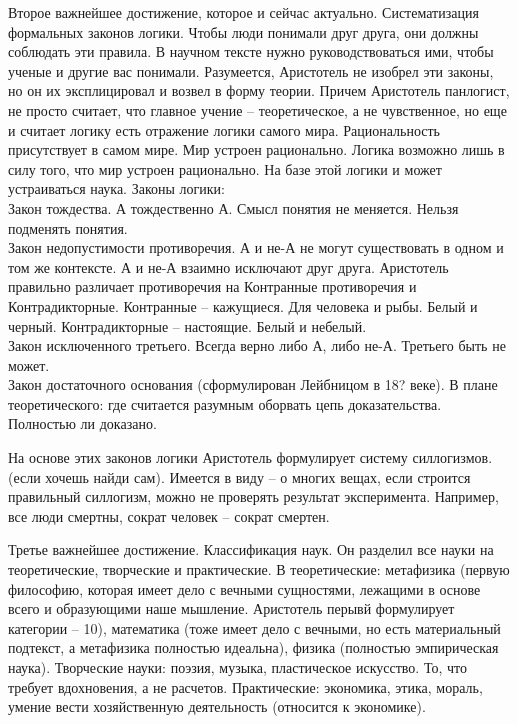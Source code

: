 \documentclass[a4paper, 12pt]{article}
\def\t{\hspace*{1cm}}
\begin{document}
Второе важнейшее достижение, которое и сейчас актуально. Систематизация формальных законов логики. Чтобы люди понимали друг друга, они должны соблюдать эти правила. В научном тексте нужно руководствоваться ими, чтобы ученые и другие вас понимали. Разумеется, Аристотель не изобрел эти законы, но он их эксплицировал и возвел в форму теории. Причем Аристотель панлогист, не просто считает, что главное учение -- теоретическое, а не чувственное, но еще и считает логику есть отражение логики самого мира. Рациональность присутствует в самом мире. Мир устроен рационально. Логика возможно лишь в силу того, что мир устроен рационально. На базе этой логики и может устраиваться наука. Законы логики:
\\\t Закон тождества. А тождественно А. Смысл понятия не меняется. Нельзя подменять понятия. 
\\\t Закон недопустимости противоречия. А и не-А не могут существовать в одном и том же контексте. А и не-А взаимно исключают друг друга. Аристотель правильно различает противоречия на Контранные противоречия и Контрадикторные. Контранные -- кажущиеся. Для человека и рыбы. Белый и черный. Контрадикторные -- настоящие. Белый и небелый. 
\\\t Закон исключенного третьего. Всегда верно либо А, либо не-А. Третьего быть не может. 
\\\t Закон достаточного основания (сформулирован Лейбницом в 18? веке). В плане теоретического: где считается разумным оборвать цепь доказательства. Полностью ли доказано. 

На основе этих законов логики Аристотель формулирует систему силлогизмов. (если хочешь найди сам). Имеется в виду -- о многих вещах, если строится правильный силлогизм, можно не проверять результат эксперимента. Например, все люди смертны, сократ человек -- сократ смертен.

Третье важнейшее достижение. Классификация наук. Он разделил все науки на теоретические, творческие и практические. В теоретические: метафизика (первую философию, которая имеет дело с вечными сущностями, лежащими в основе всего и образующими наше мышление. Аристотель перывй формулирует категории -- 10), математика (тоже имеет дело с вечными, но есть материальный подтекст, а метафизика полностью идеальна), физика (полностью эмпирическая наука). Творческие науки: поэзия, музыка, пластическое искусство. То, что требует вдохновения, а не расчетов. Практические: экономика, этика, мораль, умение вести хозяйственную деятельность (относится к экономике). 
\end{document}
